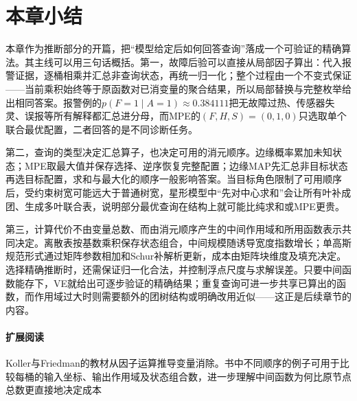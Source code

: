 \section{本章小结}
\label{sec:pgm-elimination-summary}

本章作为推断部分的开篇，把“模型给定后如何回答查询”落成一个可验证的精确算法。其主线可以用三句话概括。第一，故障后验可以直接从局部因子算出：代入报警证据，逐桶相乘并汇总非查询状态，再统一归一化；整个过程由一个不变式保证——当前乘积始终等于原函数对已消变量的聚合结果，所以局部替换与完整枚举给出相同答案。报警例的$p(F=1\mid A=1)\approx0.384111$把无故障过热、传感器失灵、误报等所有解释都汇总进分母，而MPE的$(F,H,S)=(0,1,0)$只选取单个联合最优配置，二者回答的是不同诊断任务。

第二，查询的类型决定汇总算子，也决定可用的消元顺序。边缘概率累加未知状态；MPE取最大值并保存选择、逆序恢复完整配置；边缘MAP先汇总非目标状态再选目标配置，求和与最大化的顺序一般影响答案。当目标角色限制了可用顺序后，受约束树宽可能远大于普通树宽，星形模型中“先对中心求和”会让所有叶补成团、生成多叶联合表，说明部分最优查询在结构上就可能比纯求和或MPE更贵。

第三，计算代价不由变量总数、而由消元顺序产生的中间作用域和所用函数表示共同决定。离散表按基数乘积保存状态组合，中间规模随诱导宽度指数增长；单高斯规范形式通过矩阵参数相加和Schur补解析更新，成本由矩阵块维度及填充决定。选择精确推断时，还需保证归一化合法，并控制浮点尺度与求解误差。只要中间函数能存下，VE就给出可逐步验证的精确结果；重复查询可进一步共享已算出的函数，而作用域过大时则需要额外的团树结构或明确改用近似——这正是后续章节的内容。

\paragraph{扩展阅读}
Koller与Friedman的教材从因子运算推导变量消除。书中不同顺序的例子可用于比较每桶的输入坐标、输出作用域及状态组合数，进一步理解中间函数为何比原节点总数更直接地决定成本
